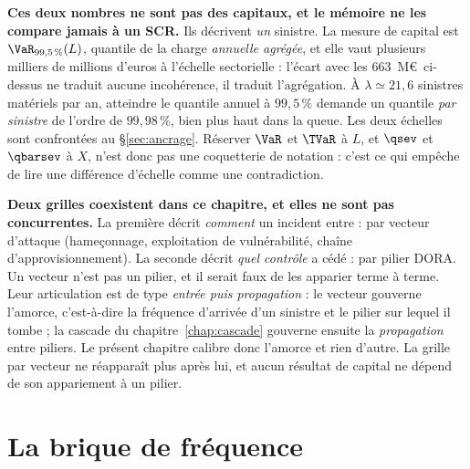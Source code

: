 \begin{attention}
\textbf{Ces deux nombres ne sont pas des capitaux, et le mémoire ne les compare jamais à un SCR.}
Ils décrivent \emph{un} sinistre. La mesure de capital est $\VaR_{99{,}5\,\%}(L)$, quantile de la
charge \emph{annuelle agrégée}, et elle vaut plusieurs milliers de millions d'euros à l'échelle
sectorielle : l'écart avec les $663$~M\euro\ ci-dessus ne traduit aucune incohérence, il traduit
l'agrégation. À $\lambda\simeq21{,}6$ sinistres matériels par an, atteindre le quantile annuel à
$99{,}5\,\%$ demande un quantile \emph{par sinistre} de l'ordre de $99{,}98\,\%$, bien plus haut
dans la queue. Les deux échelles sont confrontées au \S\ref{sec:ancrage}.
Réserver $\VaR$ et $\TVaR$ à $L$, et $\qsev$ et $\qbarsev$ à
$X$, n'est donc pas une coquetterie de notation : c'est ce qui empêche de lire une différence
d'échelle comme une contradiction.
\end{attention}


\begin{attention}
\textbf{Deux grilles coexistent dans ce chapitre, et elles ne sont pas concurrentes.} La
première décrit \emph{comment} un incident entre : par vecteur d'attaque (hameçonnage,
exploitation de vulnérabilité, chaîne d'approvisionnement). La seconde décrit \emph{quel
contrôle} a cédé : par pilier DORA. Un vecteur n'est pas un pilier, et il serait faux
de les apparier terme à terme. Leur articulation est de type \emph{entrée puis propagation} :
le vecteur gouverne l'amorce, c'est-à-dire la fréquence d'arrivée d'un sinistre et le
pilier sur lequel il tombe ; la cascade du chapitre~\ref{chap:cascade} gouverne ensuite la
\emph{propagation} entre piliers. Le présent chapitre calibre donc l'amorce et rien d'autre.
La grille par vecteur ne réapparaît plus après lui, et aucun résultat de capital ne dépend de
son appariement à un pilier.
\end{attention}

\section{La brique de fréquence}

